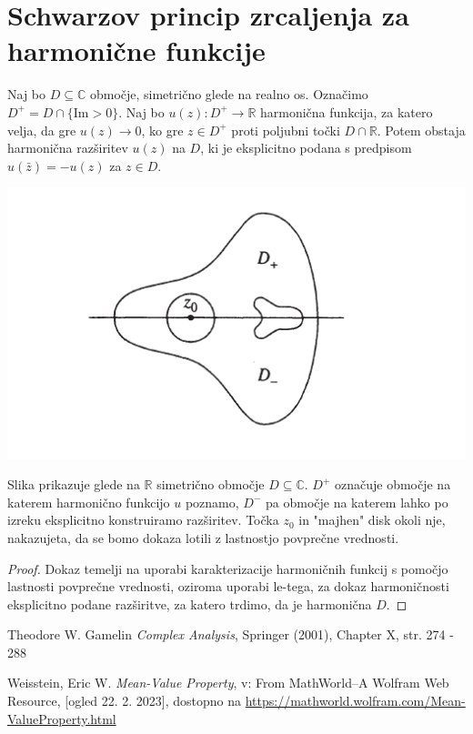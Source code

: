 \documentclass[mat1]{fmfdelo}
\newcommand{\R}{\mathbb R}
\newcommand{\C}{\mathbb C}
\begin{document}
\section{Schwarzov princip zrcaljenja za harmonične funkcije}
    \begin{izrek}
        Naj bo $D \subseteq \C$ območje, simetrično glede na realno os. 
        Označimo $D^{+} = D \cap \{\text{Im} > 0\}$. 
        Naj bo $u(z): D^{+} \to \mathbb{R}$ harmonična funkcija, za katero velja, da gre $u(z) \to 0$, ko gre $z \in D^{+}$ proti poljubni točki $D \cap \mathbb{R}$. 
        Potem obstaja harmonična razširitev $u(z)$ na $D$, ki je eksplicitno podana s predpisom $u(\bar{z}) = - u(z)$ za $z \in D$.
    \end{izrek}
    \begin{center}
        \includegraphics[width = 0.8 \textwidth]{schwarzov_princip_zrcaljenja.png}
    \end{center}
    Slika prikazuje glede na $\R$ simetrično območje $D \subseteq \C$. $D^{+}$ označuje  območje na katerem harmonično funkcijo $u$ poznamo, $D^{-}$ pa območje na katerem lahko po izreku eksplicitno konstruiramo razširitev.
    Točka $z_0$ in "majhen" disk okoli nje, nakazujeta, da se bomo dokaza lotili z lastnostjo povprečne vrednosti.
    \begin{proof}
        Dokaz temelji na uporabi karakterizacije harmoničnih funkcij s pomočjo lastnosti povprečne vrednosti, oziroma uporabi le-tega, za dokaz harmoničnosti eksplicitno podane razširitve, za katero trdimo, da je harmonična $D$.
    \end{proof}

\newpage


\begin{thebibliography}{9}
    Theodore W. Gamelin \emph{Complex Analysis}, Springer (2001), Chapter X, str. 274 - 288

    Weisstein, Eric W. \emph{Mean-Value Property}, v: From MathWorld--A Wolfram Web Resource, [ogled 22. 2. 2023], dostopno na \href{https://mathworld.wolfram.com/Mean-ValueProperty.html}{https://mathworld.wolfram.com/Mean-ValueProperty.html}
\end{thebibliography}
\end{document}
